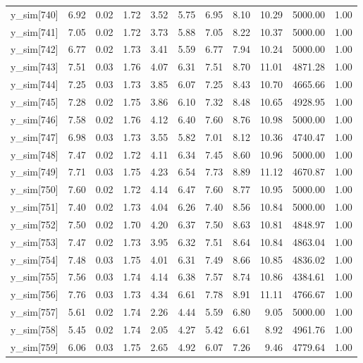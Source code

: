 \begin{table}[ht]
\begin{tabular}{rrrrrrrrrrr}
  y\_sim[740] & 6.92 & 0.02 & 1.72 & 3.52 & 5.75 & 6.95 & 8.10 & 10.29 & 5000.00 & 1.00 \\ 
  y\_sim[741] & 7.05 & 0.02 & 1.72 & 3.73 & 5.88 & 7.05 & 8.22 & 10.37 & 5000.00 & 1.00 \\ 
  y\_sim[742] & 6.77 & 0.02 & 1.73 & 3.41 & 5.59 & 6.77 & 7.94 & 10.24 & 5000.00 & 1.00 \\ 
  y\_sim[743] & 7.51 & 0.03 & 1.76 & 4.07 & 6.31 & 7.51 & 8.70 & 11.01 & 4871.28 & 1.00 \\ 
  y\_sim[744] & 7.25 & 0.03 & 1.73 & 3.85 & 6.07 & 7.25 & 8.43 & 10.70 & 4665.66 & 1.00 \\ 
  y\_sim[745] & 7.28 & 0.02 & 1.75 & 3.86 & 6.10 & 7.32 & 8.48 & 10.65 & 4928.95 & 1.00 \\ 
  y\_sim[746] & 7.58 & 0.02 & 1.76 & 4.12 & 6.40 & 7.60 & 8.76 & 10.98 & 5000.00 & 1.00 \\ 
  y\_sim[747] & 6.98 & 0.03 & 1.73 & 3.55 & 5.82 & 7.01 & 8.12 & 10.36 & 4740.47 & 1.00 \\ 
  y\_sim[748] & 7.47 & 0.02 & 1.72 & 4.11 & 6.34 & 7.45 & 8.60 & 10.96 & 5000.00 & 1.00 \\ 
  y\_sim[749] & 7.71 & 0.03 & 1.75 & 4.23 & 6.54 & 7.73 & 8.89 & 11.12 & 4670.87 & 1.00 \\ 
  y\_sim[750] & 7.60 & 0.02 & 1.72 & 4.14 & 6.47 & 7.60 & 8.77 & 10.95 & 5000.00 & 1.00 \\ 
  y\_sim[751] & 7.40 & 0.02 & 1.73 & 4.04 & 6.26 & 7.40 & 8.56 & 10.84 & 5000.00 & 1.00 \\ 
  y\_sim[752] & 7.50 & 0.02 & 1.70 & 4.20 & 6.37 & 7.50 & 8.63 & 10.81 & 4848.97 & 1.00 \\ 
  y\_sim[753] & 7.47 & 0.02 & 1.73 & 3.95 & 6.32 & 7.51 & 8.64 & 10.84 & 4863.04 & 1.00 \\ 
  y\_sim[754] & 7.48 & 0.03 & 1.75 & 4.01 & 6.31 & 7.49 & 8.66 & 10.85 & 4836.02 & 1.00 \\ 
  y\_sim[755] & 7.56 & 0.03 & 1.74 & 4.14 & 6.38 & 7.57 & 8.74 & 10.86 & 4384.61 & 1.00 \\ 
  y\_sim[756] & 7.76 & 0.03 & 1.73 & 4.34 & 6.61 & 7.78 & 8.91 & 11.11 & 4766.67 & 1.00 \\ 
  y\_sim[757] & 5.61 & 0.02 & 1.74 & 2.26 & 4.44 & 5.59 & 6.80 & 9.05 & 5000.00 & 1.00 \\ 
  y\_sim[758] & 5.45 & 0.02 & 1.74 & 2.05 & 4.27 & 5.42 & 6.61 & 8.92 & 4961.76 & 1.00 \\ 
  y\_sim[759] & 6.06 & 0.03 & 1.75 & 2.65 & 4.92 & 6.07 & 7.26 & 9.46 & 4779.64 & 1.00 \\ 

\end{tabular}
\end{table}
